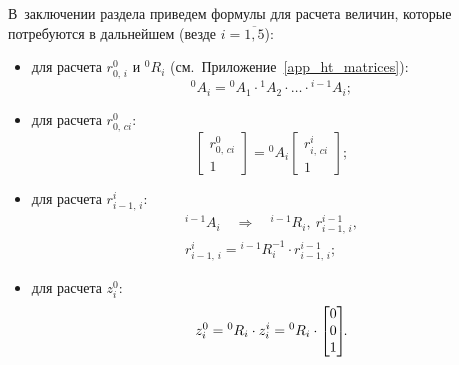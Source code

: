 В~заключении раздела приведем формулы для расчета величин, которые потребуются в дальнейшем (везде $i = \overline{1,5}$):
\begin{itemize}
    \item для расчета $r^0_{0,\,i}$ и ${}^{0}R_i$ (см.~Приложение~\ref{app_ht_matrices}):
        \begin{equation}
            {}^0A_i = {}^0A_1 \cdot {}^1A_2 \cdot \ldots \cdot {}^{i-1}A_i;
        \end{equation}
    \item для расчета $r^0_{0,\,ci}$:
        \begin{equation}
            \begin{bmatrix}
                r^0_{0,\,ci} \\ 1
            \end{bmatrix}
            = {}^0A_i
            \begin{bmatrix}
            r^i_{i,\,ci} \\ 1
            \end{bmatrix}\!\!;
        \end{equation}
    \item для расчета $r^i_{i-1,\,i}$:
        \begin{gather}
            {}^{i-1}A_i \quad \Rightarrow \quad {}^{i-1}R_i,\: r^{i-1}_{i-1,\,i},
            \\
            r^i_{i-1,\,i} = {}^{i-1}R_i^{-1} \!\cdot r^{i-1}_{i-1,\,i};
        \end{gather}
    \item для расчета $z^0_i$:
        \begin{equation}
            z^0_i = {}^{0}R_i \cdot z^i_i = {}^{0}R_i \cdot
            \begin{bmatrix}
                0 \\ 0 \\ 1
            \end{bmatrix}\!\!\ldotp
        \end{equation}
\end{itemize}

\newpage
